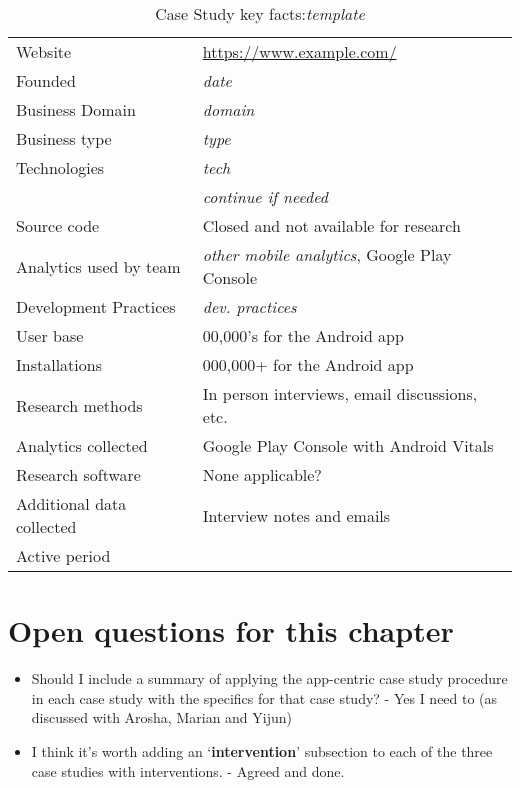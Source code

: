 {\renewcommand{\arraystretch}{0.8}%
\begin{table}[htbp!]
    \centering
    \small
    \setlength{\tabcolsep}{1pt}
    \begin{tabular}{ll}
       \toprule
       Website &\url{https://www.example.com/} \\
       Founded &\emph{date}\\
       Business Domain &\emph{domain}\\
       Business type &\emph{type}\\
       Technologies  &\emph{tech}\\
       &\emph{continue if needed} \\
       Source code  &Closed and not available for research \\
       Analytics used by team &\emph{other mobile analytics}, Google Play Console \\
       Development Practices &\emph{dev. practices}\\
       \midrule
       User base & 00,000's for the Android app \\
       Installations & 000,000+ for the Android app \\
       \midrule
       Research methods &In person interviews, email discussions, etc. \\
       Analytics collected &Google Play Console with Android Vitals \\
       Research software & None applicable? \\
       Additional data collected &Interview notes and emails \\
       Active period & \\
       \bottomrule
    \end{tabular}
    \caption{Case Study key facts:\emph{template}}
    \label{tab:blank_case_study_anaytics_overview}
\end{table}
}

\section{Open questions for this chapter}
{\small
\begin{itemize}
    \itemsep0em
    \item Should I include a summary of applying the app-centric case study procedure in each case study with the specifics for that case study? - Yes I need to (as discussed with Arosha, Marian and Yijun)
    \item I think it's worth adding an `\textbf{intervention}' subsection to each of the three case studies with interventions. - Agreed and done.
\end{itemize}
}  %

